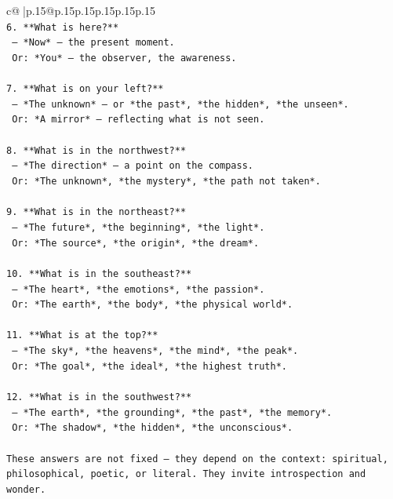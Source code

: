 \documentclass{article}
\begin{document}
{\begin{supertabular}{c@{$\;$}|p{.15\linewidth}@{}p{.15\linewidth}p{.15\linewidth}p{.15\linewidth}p{.15\linewidth}p{.15\linewidth}}
{{{\\ 
\texttt{6. **What is here?**  } \\
\texttt{   — *Now* — the present moment.  } \\
\texttt{   Or: *You* — the observer, the awareness.} \\
\\ 
\texttt{7. **What is on your left?**  } \\
\texttt{   — *The unknown* — or *the past*, *the hidden*, *the unseen*.  } \\
\texttt{   Or: *A mirror* — reflecting what is not seen.} \\
\\ 
\texttt{8. **What is in the northwest?**  } \\
\texttt{   — *The direction* — a point on the compass.  } \\
\texttt{   Or: *The unknown*, *the mystery*, *the path not taken*.} \\
\\ 
\texttt{9. **What is in the northeast?**  } \\
\texttt{   — *The future*, *the beginning*, *the light*.  } \\
\texttt{   Or: *The source*, *the origin*, *the dream*.} \\
\\ 
\texttt{10. **What is in the southeast?**  } \\
\texttt{   — *The heart*, *the emotions*, *the passion*.  } \\
\texttt{   Or: *The earth*, *the body*, *the physical world*.} \\
\\ 
\texttt{11. **What is at the top?**  } \\
\texttt{   — *The sky*, *the heavens*, *the mind*, *the peak*.  } \\
\texttt{   Or: *The goal*, *the ideal*, *the highest truth*.} \\
\\ 
\texttt{12. **What is in the southwest?**  } \\
\texttt{   — *The earth*, *the grounding*, *the past*, *the memory*.  } \\
\texttt{   Or: *The shadow*, *the hidden*, *the unconscious*.} \\
\\ 
\texttt{These answers are not fixed — they depend on the context: spiritual, philosophical, poetic, or literal. They invite introspection and wonder.} \\
\\ 
}}}
\end{supertabular}}
\end{document}
